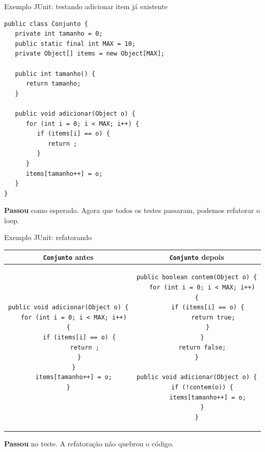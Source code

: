 \documentclass[handout]{beamer}
\begin{document}
\begin{frame}[fragile]{Exemplo JUnit: testando adicionar item já existente}

\begin{framed}
\begin{multicols}{2}
\begin{lstlisting}[basicstyle=\tiny]
public class Conjunto {
   private int tamanho = 0;
   public static final int MAX = 10;
   private Object[] items = new Object[MAX];
   
   public int tamanho() {
      return tamanho;
   }
   
   public void adicionar(Object o) {
      for (int i = 0; i < MAX; i++) {
         if (items[i] == o) {
            return ;
         }
      }
      items[tamanho++] = o;
   }
}
\end{lstlisting}
\end{multicols}
\end{framed}
\vspace{2mm}

\textcolor[rgb]{0,.5,0}{\bf Passou} como esperado. Agora que todos os testes passaram, podemos refatorar o loop.

\end{frame}




\begin{frame}[fragile]{Exemplo JUnit: refatorando}

\begin{tabular}{|c|c|}
\hline
\texttt{Conjunto} antes & \texttt{Conjunto} depois \\ \hline
\begin{minipage}{.45\textwidth}
\begin{lstlisting}[basicstyle=\tiny]
public void adicionar(Object o) {
   for (int i = 0; i < MAX; i++) {
      if (items[i] == o) {
         return ;
      }
   }
   items[tamanho++] = o;
}
\end{lstlisting}
\end{minipage} &
\begin{minipage}{.5\textwidth}
\begin{lstlisting}[basicstyle=\tiny]
public boolean contem(Object o) {
   for (int i = 0; i < MAX; i++) {
      if (items[i] == o) {
         return true;
      }
   }
   return false;
}

public void adicionar(Object o) {
   if (!contem(o)) {
      items[tamanho++] = o;
   }
}
\end{lstlisting}
\end{minipage} \\ \hline
\end{tabular}

\vspace{2mm}

\textcolor[rgb]{0,.5,0}{\bf Passou} no teste. A refatoração não quebrou o código.

\end{frame}
\end{document}
